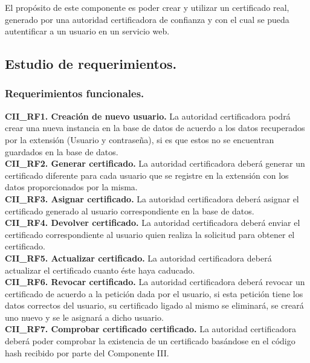 \documentclass[12pt, a4paper, titlepage]{report}
\begin{document}
	        El propósito de este componente es poder crear y utilizar un certificado real, generado por una autoridad certificadora de confianza y con el cual se pueda autentificar a un usuario en un servicio web.\\
	       
	        \subsection{Estudio de requerimientos.}
	            \subsubsection{Requerimientos funcionales.}
	            {\setlength{\parindent}{12pt}
				
				\textbf{CII\_RF1. Creación de nuevo usuario.} La autoridad certificadora podrá crear una nueva instancia en la base de datos de acuerdo a los datos recuperados por la extensión (Usuario y contraseña), si es que estos no se encuentran guardados en la base de datos.\\

				\textbf{CII\_RF2. Generar certificado.} La autoridad certificadora deberá generar un certificado diferente para cada usuario que se registre en la extensión con los datos proporcionados por la misma.\\
				
				\textbf{CII\_RF3. Asignar certificado.} La autoridad certificadora deberá asignar el certificado generado al usuario correspondiente en la base de datos.\\
				
				\textbf{CII\_RF4. Devolver certificado.} La autoridad certificadora deberá enviar el certificado correspondiente al usuario quien realiza la solicitud para obtener el certificado.\\
				
				\textbf{CII\_RF5. Actualizar certificado.} La autoridad certificadora deberá actualizar el certificado cuanto éste haya caducado.\\
				
				\textbf{CII\_RF6. Revocar certificado.} La autoridad certificadora deberá revocar un certificado de acuerdo a la petición dada por el usuario, si esta petición tiene los datos correctos del usuario, su certificado ligado al mismo se eliminará, se creará uno nuevo y se le asignará a dicho usuario.\\
				
				\textbf{CII\_RF7. Comprobar certificado certificado.} La autoridad certificadora deberá poder comprobar la existencia de un certificado basándose en el código hash recibido por parte del Componente III. 
                
		        }
		        
\end{document}
